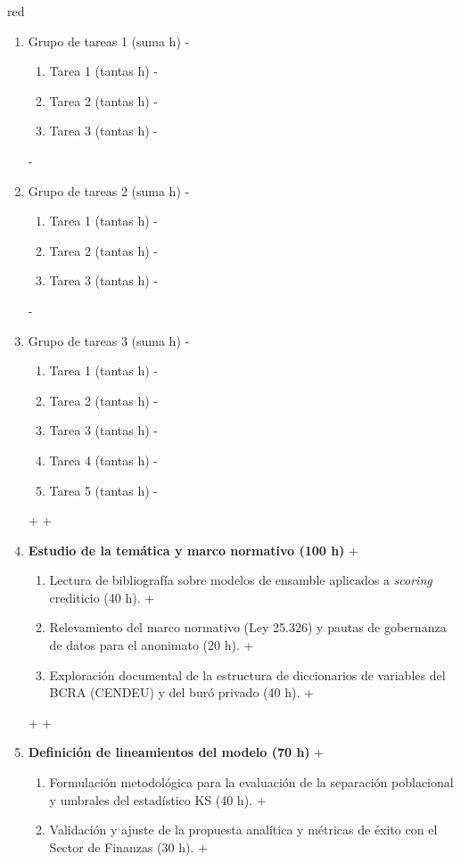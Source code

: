 \documentclass[
 11pt, %
-%
+codirector, %
 ]{charter}
\begin{document}
\begin{table}[ht]
\begin{table}[ht]
\begin{consigna}{red}
 \begin{enumerate}
-\item Grupo de tareas 1 (suma h)
-	\begin{enumerate}
-	\item Tarea 1 (tantas h)
-	\item Tarea 2 (tantas h)
-	\item Tarea 3 (tantas h)
-	\end{enumerate}
-\item Grupo de tareas 2 (suma h)
-	\begin{enumerate}
-	\item Tarea 1 (tantas h)
-	\item Tarea 2 (tantas h)
-	\item Tarea 3 (tantas h)
-	\end{enumerate}
-\item Grupo de tareas 3 (suma h)
-	\begin{enumerate}
-	\item Tarea 1 (tantas h)
-	\item Tarea 2 (tantas h)
-	\item Tarea 3 (tantas h)
-	\item Tarea 4 (tantas h)
-	\item Tarea 5 (tantas h)
-	\end{enumerate}
+
+    \item \textbf{Estudio de la temática y marco normativo (100 h)}
+    \begin{enumerate}
+        \item Lectura de bibliografía sobre modelos de ensamble aplicados a \textit{scoring} crediticio (40 h).
+        \item Relevamiento del marco normativo (Ley 25.326) y pautas de gobernanza de datos para el anonimato (20 h).
+        \item Exploración documental de la estructura de diccionarios de variables del BCRA (CENDEU) y del buró privado (40 h).
+    \end{enumerate}
+
+    \item \textbf{Definición de lineamientos del modelo (70 h)}
+    \begin{enumerate}
+        \item Formulación metodológica para la evaluación de la separación poblacional y umbrales del estadístico KS (40 h).
+        \item Validación y ajuste de la propuesta analítica y métricas de éxito con el Sector de Finanzas (30 h).
+    \end{enumerate}

\end{enumerate}
\end{consigna}
\end{table}
\end{table}
\end{document}
